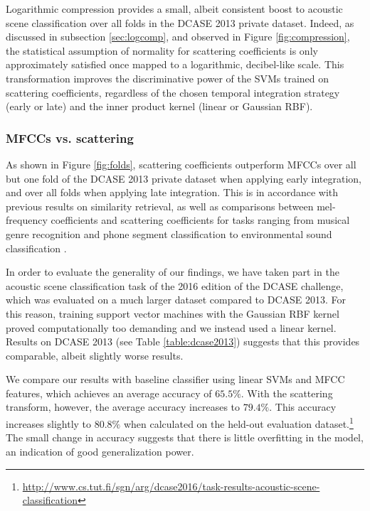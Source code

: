\documentclass[journal]{IEEEtran}
\makeatletter
\newcommand*{\vs}{vs.\@\xspace}
\makeatother
\begin{document}
Logarithmic compression provides a small, albeit consistent boost to acoustic scene classification over all folds in the DCASE 2013 private dataset.
Indeed, as discussed in subsection \ref{sec:logcomp}, and observed in Figure \ref{fig:compression}, the statistical assumption of normality for scattering coefficients is only approximately satisfied once mapped to a logarithmic, decibel-like scale. This transformation improves the discriminative power of the SVMs trained on scattering coefficients, regardless of the chosen temporal integration strategy (early or late) and the inner product kernel (linear or Gaussian RBF).

\subsubsection*{MFCCs \vs scattering}

As shown in Figure \ref{fig:folds}, scattering coefficients outperform MFCCs over all but one fold of the DCASE 2013 private dataset when applying early integration, and over all folds when applying late integration.
This is in accordance with previous results on similarity retrieval, as well as comparisons between mel-frequency coefficients and scattering coefficients for tasks ranging from musical genre recognition and phone segment classification \cite{Anden2014} to environmental sound classification \cite{Salamon2015}.

In order to evaluate the generality of our findings, we have taken part in the acoustic scene classification task of the 2016 edition of the DCASE challenge, which was evaluated on a much larger dataset compared to DCASE 2013. For this reason, training support vector machines with the Gaussian RBF kernel proved computationally too demanding and we instead used a linear kernel. Results on DCASE 2013 (see Table \ref{table:dcase2013}) suggests that this provides comparable, albeit slightly worse results.

We compare our results with baseline classifier using linear SVMs and MFCC features, which achieves an average accuracy of $65.5\%$. With the scattering transform, however, the average accuracy increases to $79.4\%$. This accuracy increases slightly to $80.8\%$ when calculated on the held-out evaluation dataset.\footnote{\url{http://www.cs.tut.fi/sgn/arg/dcase2016/task-results-acoustic-scene-classification}} The small change in accuracy suggests that there is little overfitting in the model, an indication of good generalization power.
\end{document}
